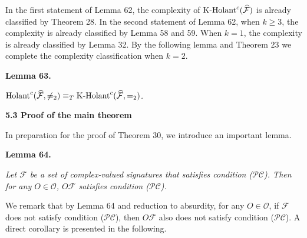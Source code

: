


In the first statement of Lemma 62, the complexity of $\textup{{K-Holant}}^{c}(\widehat{\mathcal{F}})$ is already classified by Theorem 28.
In the second statement of Lemma 62, when $k\geq 3$, the complexity is already classified by Lemma 58 and 59. When $k=1$, the complexity is already classified by Lemma 32. By the following lemma and Theorem 23 we complete the complexity classification when $k=2$.\par





\par\medskip\noindent\textbf{
\textbf{Lemma 63}\textbf{.}
}\par



$\textup{{Holant}}^{c}(\widehat{\mathcal{F}},\neq_{2})\equiv_{T}\textup{{K-Holant}}^{c}(\widehat{\mathcal{F}},=_{2})$\emph{.}\par







\par\medskip\noindent\textbf{
5.3 Proof of the main theorem}\par




In preparation for the proof of Theorem 30, we introduce an important lemma.\par





\par\medskip\noindent\textbf{
\textbf{Lemma 64}\textbf{.}
}\par



\emph{Let $\mathcal{F}$ be a set of complex-valued signatures that satisfies condition ($\mathcal{PC}$). Then for any $O\in\mathscr{O}$, $O\mathcal{F}$ satisfies condition ($\mathcal{PC}$).}\par






We remark that by Lemma 64 and reduction to absurdity, for any $O\in\mathscr{O}$, if $\mathcal{F}$ does not satisfy condition ($\mathcal{PC}$), then $O\mathcal{F}$ also does not satisfy condition ($\mathcal{PC}$). A direct corollary is presented in the following.\par



